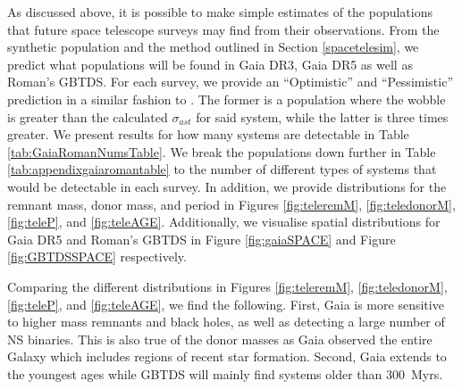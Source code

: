 \documentclass{pas}
\begin{document}
As discussed above, it is possible to make simple estimates of the populations that future space telescope surveys may find from their observations. From the synthetic population and the method outlined in Section \ref{spacetelesim}, we predict what populations will be found in Gaia DR3, Gaia DR5 as well as Roman's GBTDS. For each survey, we provide an ``Optimistic'' and ``Pessimistic'' prediction in a similar fashion to \citet{2025arXiv250821805C}. The former is a population where the wobble is greater than the calculated $\sigma_{ast}$ for said system, while the latter is three times greater. We present results for how many systems are detectable in Table \ref{tab:GaiaRomanNumsTable}. We break the populations down further in Table \ref{tab:appendixgaiaromantable} to the number of different types of systems that would be detectable in each survey. In addition, we provide distributions for the remnant mass, donor mass, and period in Figures \ref{fig:teleremM}, \ref{fig:teledonorM}, \ref{fig:teleP}, and \ref{fig:teleAGE}. Additionally, we visualise spatial distributions for Gaia DR5 and Roman's GBTDS in Figure \ref{fig:gaiaSPACE} and Figure \ref{fig:GBTDSSPACE} respectively. 

Comparing the different distributions in Figures \ref{fig:teleremM}, \ref{fig:teledonorM}, \ref{fig:teleP}, and \ref{fig:teleAGE}, we find the following. First, Gaia is more sensitive to higher mass remnants and black holes, as well as detecting a large number of NS binaries. This is also true of the donor masses as Gaia observed the entire Galaxy which includes regions of recent star formation. Second, Gaia extends to the youngest ages while GBTDS will mainly find systems older than 300~Myrs. 
\end{document}

